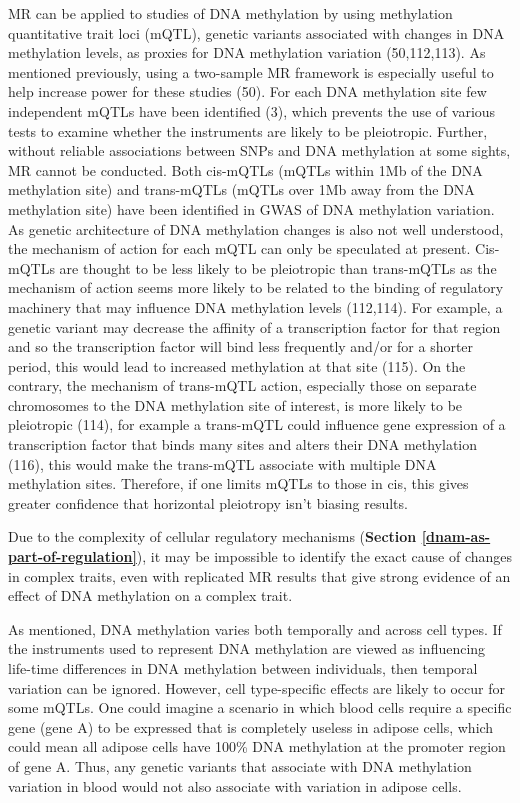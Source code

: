 \documentclass[11pt,oneside]{bristolthesis}
\begin{document}
MR can be applied to studies of DNA methylation by using methylation quantitative trait loci (mQTL), genetic variants associated with changes in DNA methylation levels, as proxies for DNA methylation variation (50,112,113). As mentioned previously, using a two-sample MR framework is especially useful to help increase power for these studies (50). For each DNA methylation site few independent mQTLs have been identified (3), which prevents the use of various tests to examine whether the instruments are likely to be pleiotropic. Further, without reliable associations between SNPs and DNA methylation at some sights, MR cannot be conducted. Both cis-mQTLs (mQTLs within 1Mb of the DNA methylation site) and trans-mQTLs (mQTLs over 1Mb away from the DNA methylation site) have been identified in GWAS of DNA methylation variation. As genetic architecture of DNA methylation changes is also not well understood, the mechanism of action for each mQTL can only be speculated at present. Cis-mQTLs are thought to be less likely to be pleiotropic than trans-mQTLs as the mechanism of action seems more likely to be related to the binding of regulatory machinery that may influence DNA methylation levels (112,114). For example, a genetic variant may decrease the affinity of a transcription factor for that region and so the transcription factor will bind less frequently and/or for a shorter period, this would lead to increased methylation at that site (115). On the contrary, the mechanism of trans-mQTL action, especially those on separate chromosomes to the DNA methylation site of interest, is more likely to be pleiotropic (114), for example a trans-mQTL could influence gene expression of a transcription factor that binds many sites and alters their DNA methylation (116), this would make the trans-mQTL associate with multiple DNA methylation sites. Therefore, if one limits mQTLs to those in cis, this gives greater confidence that horizontal pleiotropy isn't biasing results.

Due to the complexity of cellular regulatory mechanisms (\textbf{Section \ref{dnam-as-part-of-regulation}}), it may be impossible to identify the exact cause of changes in complex traits, even with replicated MR results that give strong evidence of an effect of DNA methylation on a complex trait.

As mentioned, DNA methylation varies both temporally and across cell types. If the instruments used to represent DNA methylation are viewed as influencing life-time differences in DNA methylation between individuals, then temporal variation can be ignored. However, cell type-specific effects are likely to occur for some mQTLs. One could imagine a scenario in which blood cells require a specific gene (gene A) to be expressed that is completely useless in adipose cells, which could mean all adipose cells have 100\% DNA methylation at the promoter region of gene A. Thus, any genetic variants that associate with DNA methylation variation in blood would not also associate with variation in adipose cells.
\end{document}
